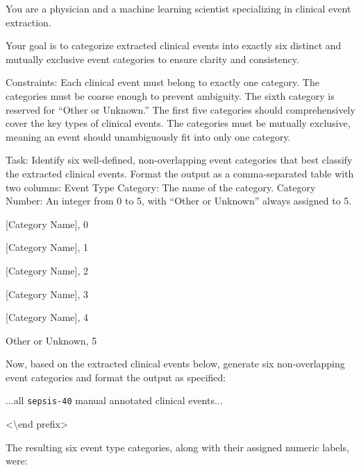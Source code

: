 \documentclass[pmlr,twocolumn,10pt]{jmlr} %
\begin{document}
\begin{tcolorbox}[
  colback=yellow!10,
  colframe=orange!80!black,
  title=Event Type Category Generation Prompt,
  boxrule=2pt
]
\footnotesize
\setlength{\parskip}{1pt}
You are a physician and a machine learning scientist specializing in clinical event extraction. 

Your goal is to categorize extracted clinical events into exactly six distinct and mutually exclusive event categories to ensure clarity and consistency.

Constraints:
Each clinical event must belong to exactly one category.
The categories must be coarse enough to prevent ambiguity.
The sixth category is reserved for ``Other or Unknown.'' The first five categories should comprehensively cover the key types of clinical events.
The categories must be mutually exclusive, meaning an event should unambiguously fit into only one category.

Task:
Identify six well-defined, non-overlapping event categories that best classify the extracted clinical events.
Format the output as a comma-separated table with two columns:
Event Type Category: The name of the category.
Category Number: An integer from 0 to 5, with ``Other or Unknown'' always assigned to 5.

[Category Name], 0

[Category Name], 1

[Category Name], 2

[Category Name], 3

[Category Name], 4

Other or Unknown, 5

Now, based on the extracted clinical events below, generate six non-overlapping event categories and format the output as specified:

...all \texttt{sepsis-40} manual annotated clinical events...

\textless \textbackslash end prefix\textgreater
\end{tcolorbox}

The resulting six event type categories, along with their assigned numeric labels, were:
\end{document}

